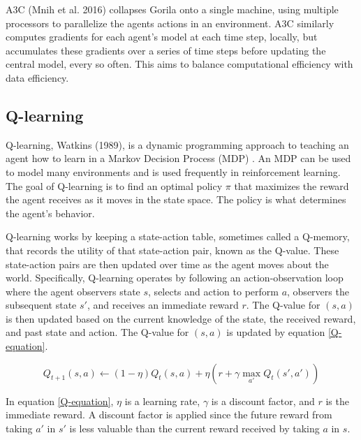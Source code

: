 \documentclass[jair,twoside,11pt,theapa]{article}
\begin{document}
A3C (Mnih et al. 2016)\nocite{A3C} collapses Gorila onto a single machine, using multiple processors to parallelize the agents actions in an environment. A3C similarly computes gradients for each agent's model at each time step, locally, but accumulates these gradients over a series of time steps before updating the central model, every so often. This aims to balance computational efficiency with data efficiency. 

\subsection{Q-learning}
\label{Q-learning}
Q-learning, Watkins (1989)\nocite{watkins}, is a dynamic programming approach to teaching an agent how to learn in a Markov Decision Process (MDP) \cite{Bellman}. An MDP can be used to model many environments and is used frequently in reinforcement learning. The goal of Q-learning is to find an optimal policy $\pi$ that maximizes the reward the agent receives as it moves in the state space. The policy is what determines the agent's behavior. 

Q-learning works by keeping a state-action table, sometimes called a Q-memory, that records the utility of that state-action pair, known as the Q-value. These state-action pairs are then updated over time as the agent moves about the world. Specifically, Q-learning operates by following an action-observation loop where the agent observers state $s$, selects and action to perform $a$, observers the subsequent state $s'$, and receives an immediate reward $r$. The Q-value for $(s,a)$ is then updated based on the current knowledge of the state, the received reward, and past state and action. The Q-value for $(s,a)$ is updated by equation \ref{Q-equation}.

\begin{equation}
\label{Q-equation}
Q_{t+1}(s,a) \leftarrow (1-\eta)Q_t(s,a) + \eta(r + \gamma \max_{a'} Q_t(s',a'))
\end{equation}

In equation \ref{Q-equation}, $\eta$ is a learning rate, $\gamma$ is a discount factor, and $r$ is the immediate reward. A discount factor is applied since the future reward from taking $a'$ in $s'$ is less valuable than the current reward received by taking $a$ in $s$. 
\end{document}
